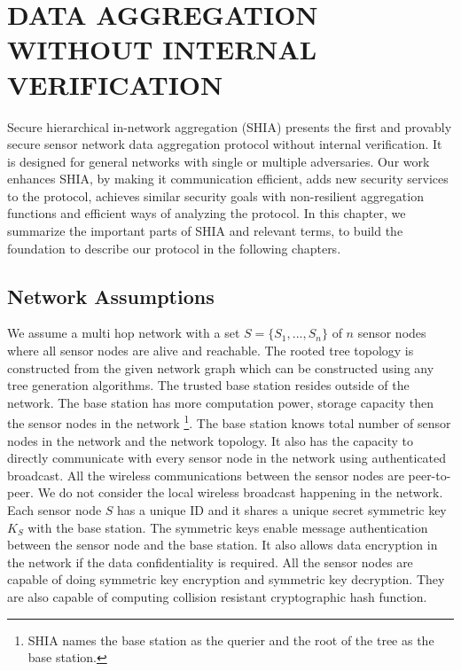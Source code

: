 \chapter{DATA AGGREGATION WITHOUT INTERNAL VERIFICATION} %
	\label{cha:Data Aggregation Without Internal Verification}

	Secure hierarchical in-network aggregation (SHIA) \cite{chan2006secure} presents the first and provably secure sensor network data aggregation protocol without internal verification.
	It is designed for general networks with single or multiple adversaries.
	Our work enhances SHIA, by making it communication efficient, adds new security services to the protocol, achieves similar security goals with non-resilient aggregation functions and efficient ways of analyzing the protocol.
	In this chapter, we summarize the important parts of SHIA and relevant terms, to build the foundation to describe our protocol in the following chapters.

\section{Network Assumptions}
	We assume a multi hop network with a set $ S = \{S_{1},...,S_{n}\} $ of $n$ sensor nodes where all sensor nodes are alive and reachable. 
	The rooted tree topology is constructed from the given network graph which can be constructed using any tree generation algorithms.
	The trusted base station resides outside of the network.
	The base station has more computation power, storage capacity then the sensor nodes in the network 
	\footnote{SHIA names the base station as the querier and the root of the tree as the base station.}. 
	The base station knows total number of sensor nodes in the network and the network topology. 
	It also has the capacity to directly communicate with every sensor node in the network using authenticated broadcast.
	All the wireless communications between the sensor nodes are peer-to-peer.
	We do not consider the local wireless broadcast happening in the network.
	Each sensor node $S$ has a unique ID and it shares a unique secret symmetric key $K_{S}$ with the base station.
	The symmetric keys enable message authentication between the sensor node and the base station.
	It also allows data encryption in the network if the data confidentiality is required.
	All the sensor nodes are capable of doing symmetric key encryption and symmetric key decryption.
	They are also capable of computing collision resistant cryptographic hash function. 

